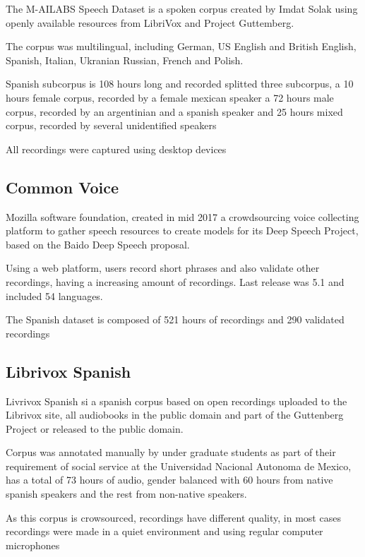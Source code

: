 \documentclass{article}
\begin{document}
The M-AILABS Speech Dataset is a spoken corpus created by Imdat Solak using openly available resources from LibriVox and Project Guttemberg.

The corpus was multilingual, including German, US English and British English, Spanish, Italian, Ukranian Russian, French and Polish.

Spanish subcorpus is 108 hours long and recorded splitted three subcorpus, a 10 hours female corpus, recorded by a female mexican speaker a 72 hours male corpus, recorded by an argentinian and a spanish speaker and  25 hours mixed corpus, recorded by several unidentified speakers

All recordings were captured using desktop devices

\subsection{Common Voice}

Mozilla software foundation, created in mid 2017 a crowdsourcing voice collecting platform to gather speech resources to create models for its Deep Speech Project, based on the Baido Deep Speech proposal.

Using a web platform, users record short phrases and also validate other recordings, having a increasing amount of recordings. Last release was 5.1 and included  54 languages.

The Spanish dataset is composed of 521 hours of recordings and 290 validated recordings 

\subsection{Librivox Spanish}

Livrivox Spanish si a spanish corpus based on open recordings uploaded to the Librivox site, all audiobooks in the public domain and part of the Guttenberg Project or released to the public domain.

Corpus was annotated manually by under graduate students as part of their requirement of social service at the Universidad Nacional Autonoma de Mexico, has a total of 73 hours of audio, gender balanced with 60 hours from native spanish speakers
and the rest from non-native speakers.

As this corpus is crowsourced, recordings have different quality, in most cases recordings were made in a quiet environment and using regular computer microphones
\end{document}

